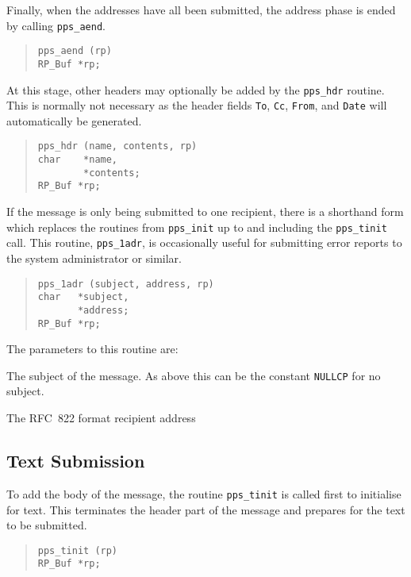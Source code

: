 Finally, when the addresses have all been submitted, the address phase
is ended by calling \verb|pps_aend|.
\begin{quote}\begin{verbatim}
pps_aend (rp)
RP_Buf *rp;
\end{verbatim}\end{quote}

At this stage, other headers may optionally be added by the
\verb|pps_hdr| routine. This is normally not necessary as the header
fields \verb|To|, \verb|Cc|, \verb|From|, and \verb|Date| will
automatically be generated.
\begin{quote}\begin{verbatim}
pps_hdr (name, contents, rp)
char    *name,
        *contents;
RP_Buf *rp;
\end{verbatim}\end{quote}

If the message is only being submitted to one recipient, there is a
shorthand form which replaces the routines from \verb|pps_init| up to
and including the \verb|pps_tinit| call. This routine, \verb|pps_1adr|,
is occasionally useful for submitting error reports to the system
administrator or similar.
\begin{quote}\begin{verbatim}
pps_1adr (subject, address, rp)
char   *subject,
       *address;
RP_Buf *rp;
\end{verbatim}\end{quote}
The parameters to this routine are:
\begin{describe}
\item[\verb|subject|:] The subject of the message. As above this can
be the constant \verb|NULLCP| for no subject.

\item[\verb|address|:] The RFC~822 format recipient address
\end{describe}

\subsection{Text Submission}

To add the body of the message, the routine \verb|pps_tinit| is called
first to initialise for text. This terminates the header part of the
message and prepares for the text to be submitted.
\begin{quote}\begin{verbatim}
pps_tinit (rp)
RP_Buf *rp;
\end{verbatim}\end{quote}

